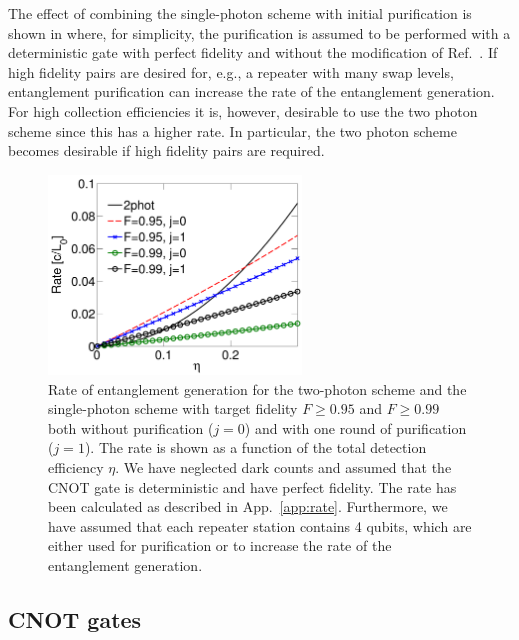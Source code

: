 The effect of combining the single-photon scheme with initial purification is
shown in  where, for simplicity, the purification is
assumed to be performed with a deterministic gate with perfect fidelity and
without the modification of Ref.~\cite{nickerson}. If high fidelity pairs are
desired for, e.g., a repeater with many swap levels, entanglement purification
can increase the rate of the entanglement generation. For high collection
efficiencies it is, however, desirable to use the two photon scheme since this
has a higher rate. In particular, the two photon scheme becomes desirable if
high fidelity pairs are required.

\begin{figure} 
\centering
\includegraphics[width=0.6\textwidth]{./figs_Borregaard_PRA2015/figureX3}
\caption[Purification]{Rate of entanglement generation for the two-photon scheme
and the single-photon scheme with target fidelity $F\geq0.95$ and $F\geq0.99$
both without purification ($j=0$) and with one round of purification ($j=1$).
The rate is shown as a function of the total detection efficiency $\eta$. We
have neglected dark counts and assumed that the CNOT gate is deterministic and
have perfect fidelity. The rate has been calculated as described in
App.~\ref{app:rate}. Furthermore, we have assumed that each repeater station
contains 4 qubits, which are either used for purification or to increase the
rate of the entanglement generation. }
\label{fig:figureX3}
\end{figure} 

\subsection{CNOT gates} \label{sec:CNOTgate}

